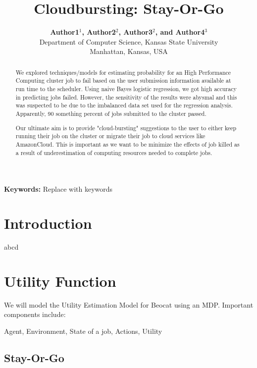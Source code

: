 \documentclass[conference]{csce}
\title{\bf Cloudbursting: Stay-Or-Go }     %
\author{
{\bfseries Author1$^1$, Author2$^2$, Author3$^2$, and Author4$^3$}\\
Department of Computer Science, Kansas State University\\ Manhattan, Kansas, USA\\
}
\begin{document}
\maketitle %


\begin{abstract}%
We explored techniques/models for estimating
probability for an High Performance Computing cluster job to fail 
based on the user submission information available at run time to 
the scheduler. Using naive Bayes logistic regression, we got high 
accuracy in predicting jobs failed. However, the sensitivity 
of the results were abysmal and this was suspected to be due to the 
imbalanced data set used for the regression analysis. 
Apparently, 90 something percent of jobs submitted to the cluster passed.

Our ultimate aim is to provide "cloud-bursting" suggestions to the 
user to either keep running their job on the cluster or migrate their
job to cloud services like AmazonCloud. This is important as we want to 
be minimize the effects of job killed as a result of underestimation of
computing resources needed to complete jobs.

\end{abstract}


\vspace{1em}
\noindent\textbf{Keywords:}
 {\small  Replace with keywords} %



\section{Introduction}
abcd













 
\section{Utility Function}
We will model the Utility Estimation Model for Beocat using an MDP. Important components include:

Agent, Environment, State of a job, Actions, Utility

\subsection{Stay-Or-Go}
\end{document}
